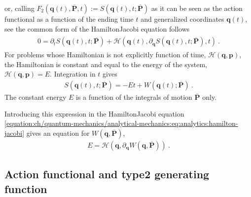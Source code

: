 \documentclass[letterpaper,10pt,english]{jupyterBook}
\begin{document}
or, calling \(F_2(\mathbf{q}(t), \overline{\mathbf{P}}, t) := S(\mathbf{q}(t), t; \overline{\mathbf{P}})\) \sphinxhyphen{} as it can be seen as the action functional as a function of the ending time \(t\) and generalized coordinates \(\mathbf{q}(t)\), see {\hyperref[\detokenize{ch/quantum-mechanics/analytical-mechanics:quantum-mechanics-analytical-mechanics-action-functional-type-2-gen-fun}]{}} \sphinxhyphen{} the common form of the Hamilton\sphinxhyphen{}Jacobi equation follows
\begin{equation}\label{equation:ch/quantum-mechanics/analytical-mechanics:eq:analytics:hamilton-jacobi}
\begin{split}\begin{aligned}
  0 = \partial_t S\left( \mathbf{q}(t), t; \overline{\mathbf{P}} \right) + \mathcal{H}\left(\mathbf{q}(t), \partial_{\mathbf{q}} S(\mathbf{q}(t), t; \overline{\mathbf{P}}) , t \right) \ .
\end{aligned}\end{split}
\end{equation}
\sphinxAtStartPar
{} For problems whose Hamiltonian is not explicitly function of time, \(\mathcal{H}(\mathbf{q}, \mathbf{p})\), the Hamiltonian is constant and equal to the energy of the system, \(\mathcal{H}(\mathbf{q}, \mathbf{p}) = E\). Integration in \(t\) gives
\begin{equation*}
\begin{split}S\left(\mathbf{q}(t), t; \overline{\mathbf{P}} \right) = - E t + W\left(\mathbf{q}(t); \overline{\mathbf{P}} \right) \ .\end{split}
\end{equation*}
\sphinxAtStartPar
The constant energy \(E\) is a function of the integrals of motion \(\overline{\mathbf{P}}\) only.

\sphinxAtStartPar
Introducing this expression in the Hamilton\sphinxhyphen{}Jacobi equation \eqref{equation:ch/quantum-mechanics/analytical-mechanics:eq:analytics:hamilton-jacobi} gives an equation for \(W\left( \mathbf{q}, \overline{\mathbf{P}} \right)\),
\begin{equation*}
\begin{split}E = \mathcal{H}\left( \mathbf{q}, \partial_{\mathbf{q}} W\left(\mathbf{q}, \overline{\mathbf{P}} \right) \right) \ .\end{split}
\end{equation*}

\subsection{Action functional and type\sphinxhyphen{}2 generating function}
\label{\detokenize{ch/quantum-mechanics/analytical-mechanics:action-functional-and-type-2-generating-function}}\label{\detokenize{ch/quantum-mechanics/analytical-mechanics:quantum-mechanics-analytical-mechanics-action-functional-type-2-gen-fun}}
\end{document}
